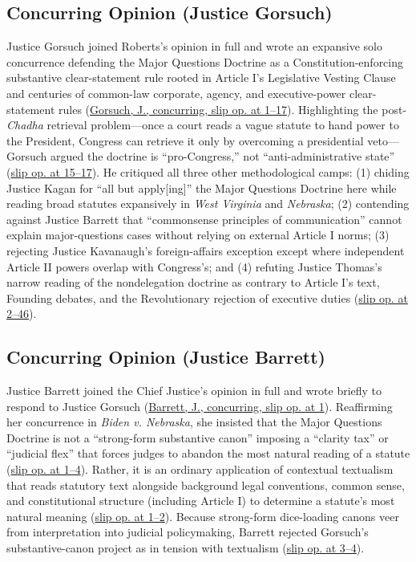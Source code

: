 \documentclass[12pt]{article}
\begin{document}
\subsection{Concurring Opinion (Justice Gorsuch)}
Justice Gorsuch joined Roberts's opinion in full and wrote an expansive solo concurrence defending the Major Questions Doctrine as a Constitution-enforcing substantive clear-statement rule rooted in Article I's Legislative Vesting Clause and centuries of common-law corporate, agency, and executive-power clear-statement rules (\href{https://www.law.cornell.edu/supremecourt/text/24-1287}{Gorsuch, J., concurring, slip op. at 1--17}). Highlighting the post-\textit{Chadha} retrieval problem---once a court reads a vague statute to hand power to the President, Congress can retrieve it only by overcoming a presidential veto---Gorsuch argued the doctrine is ``pro-Congress,'' not ``anti-administrative state'' (\href{https://www.law.cornell.edu/supremecourt/text/24-1287}{slip op. at 15--17}). He critiqued all three other methodological camps: (1) chiding Justice Kagan for ``all but apply[ing]'' the Major Questions Doctrine here while reading broad statutes expansively in \textit{West Virginia} and \textit{Nebraska}; (2) contending against Justice Barrett that ``commonsense principles of communication'' cannot explain major-questions cases without relying on external Article I norms; (3) rejecting Justice Kavanaugh's foreign-affairs exception except where independent Article II powers overlap with Congress's; and (4) refuting Justice Thomas's narrow reading of the nondelegation doctrine as contrary to Article I's text, Founding debates, and the Revolutionary rejection of executive duties (\href{https://www.law.cornell.edu/supremecourt/text/24-1287}{slip op. at 2--46}).

\subsection{Concurring Opinion (Justice Barrett)}
Justice Barrett joined the Chief Justice's opinion in full and wrote briefly to respond to Justice Gorsuch (\href{https://www.law.cornell.edu/supremecourt/text/24-1287}{Barrett, J., concurring, slip op. at 1}). Reaffirming her concurrence in \textit{Biden v. Nebraska}, she insisted that the Major Questions Doctrine is not a ``strong-form substantive canon'' imposing a ``clarity tax'' or ``judicial flex'' that forces judges to abandon the most natural reading of a statute (\href{https://www.law.cornell.edu/supremecourt/text/24-1287}{slip op. at 1--4}). Rather, it is an ordinary application of contextual textualism that reads statutory text alongside background legal conventions, common sense, and constitutional structure (including Article I) to determine a statute's most natural meaning (\href{https://www.law.cornell.edu/supremecourt/text/24-1287}{slip op. at 1--2}). Because strong-form dice-loading canons veer from interpretation into judicial policymaking, Barrett rejected Gorsuch's substantive-canon project as in tension with textualism (\href{https://www.law.cornell.edu/supremecourt/text/24-1287}{slip op. at 3--4}).
\end{document}
